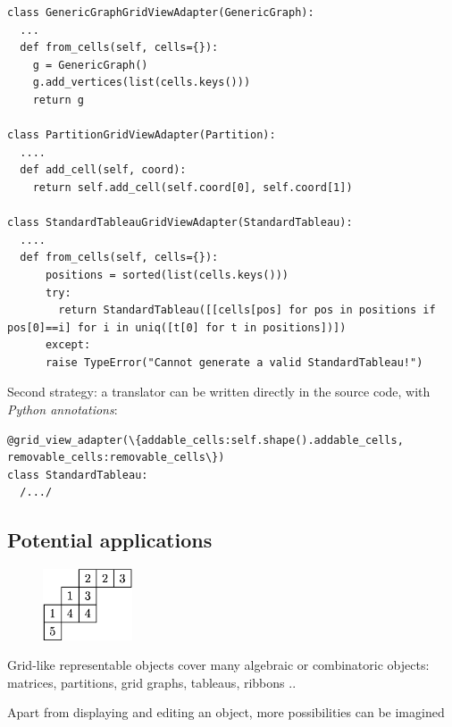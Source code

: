 \documentclass{deliverablereport}
\begin{document}
\begin{lstlisting}
class GenericGraphGridViewAdapter(GenericGraph):
  ...
  def from_cells(self, cells={}):
    g = GenericGraph()
    g.add_vertices(list(cells.keys()))
    return g

class PartitionGridViewAdapter(Partition):
  ....
  def add_cell(self, coord):
    return self.add_cell(self.coord[0], self.coord[1])

class StandardTableauGridViewAdapter(StandardTableau):
  ....
  def from_cells(self, cells={}):
      positions = sorted(list(cells.keys()))
      try:
        return StandardTableau([[cells[pos] for pos in positions if pos[0]==i] for i in uniq([t[0] for t in positions])])
      except:
      raise TypeError("Cannot generate a valid StandardTableau!")
\end{lstlisting}

Second strategy: a translator can be written directly in the source
code, with \emph{Python annotations}:

\begin{lstlisting}
@grid_view_adapter(\{addable_cells:self.shape().addable_cells, removable_cells:removable_cells\})
class StandardTableau:
  /.../
\end{lstlisting}


\subsection{Potential applications}

\begin{figure}
    \begin{center}
      \includegraphics[width=100px]{images/JDTSlide}
\end{center}
\end{figure}

Grid-like representable objects cover many algebraic or combinatoric
objects: matrices, partitions, grid graphs, tableaus, ribbons ..

Apart from displaying and editing an object, more possibilities can be
imagined
\end{document}
